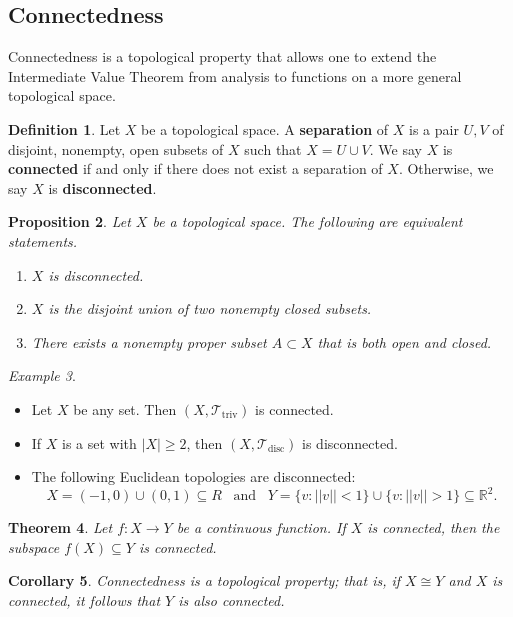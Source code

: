 \documentclass[ 12pt ]{article}
\newcounter{lecture_num}
\theoremstyle{plain}
\theoremstyle{plain}
\newtheorem{theorem}{Theorem}[lecture_num]
\newtheorem{proposition}[theorem]{Proposition}
\newtheorem{corollary}[theorem]{Corollary}
\theoremstyle{definition}
\newtheorem{definition}[theorem]{Definition}
\theoremstyle{remark}
\newtheorem{example}[theorem]{Example}
\begin{document}
\subsection*{Connectedness}

Connectedness is a topological property that allows one to extend the Intermediate Value Theorem from analysis to functions on a more general topological space.

\begin{definition}
	Let $X$ be a topological space. A \textbf{separation} of $X$ is a pair $U, V$ of disjoint, nonempty, open subsets of $X$ such that $X = U \cup V$.
	We say $X$ is \textbf{connected} if and only if there does not exist a separation of $X$. Otherwise, we say $X$ is \textbf{disconnected}.
\end{definition}

\begin{proposition}
	Let $X$ be a topological space. The following are equivalent statements.
	\begin{enumerate}
		\item $X$ is disconnected.
		\item $X$ is the disjoint union of two nonempty closed subsets.
		\item There exists a nonempty proper subset $A \subset X$ that is both open and closed.
	\end{enumerate}
\end{proposition}

\begin{example} $ $
	\begin{itemize}
		\item Let $X$ be any set. Then $(X, \mathcal{T}_\mathrm{triv})$ is connected.
		\item If $X$ is a set with $|X| \geq 2$, then $(X, \mathcal{T}_\mathrm{disc})$ is disconnected.
		\item The following Euclidean topologies are disconnected: $$X = (-1, 0) \cup (0, 1) \subseteq{R}\;\;\; \mathrm{and}\;\;\; Y = \{ v : ||v|| < 1 \} \cup \{ v : ||v|| > 1 \}
			\subseteq \mathbb{R}^2.$$
	\end{itemize}
\end{example}

\begin{theorem}
	Let $f : X \to Y$ be a continuous function. If $X$ is connected, then the subspace $f(X) \subseteq Y$ is connected.
\end{theorem}

\begin{corollary}
	Connectedness is a topological property; that is, if $X \cong Y$ and $X$ is connected, it follows that $Y$ is also connected.
\end{corollary}
\end{document}

